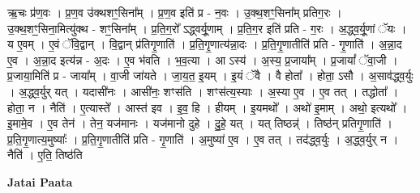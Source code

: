 \documentclass[17pt]{extarticle}
\begin{document}
ऋ॒चः प्र॑ण॒वः । प्र॒ण॒व उ॑क्थशꣳ॒॒सिना᳚म् । प्र॒ण॒व इति॑ प्र - न॒वः । उ॒क्थ॒शꣳ॒॒सिना᳚म् प्रतिग॒रः । उ॒क्थ॒शꣳ॒॒सिना॒मित्यु॑क्थ - शꣳ॒॒सिना᳚म् । प्र॒ति॒ग॒रो᳚ ऽद्ध्वर्यू॒णाम् । प्र॒ति॒ग॒र इति॑ प्रति - ग॒रः । अ॒द्ध्व॒र्यू॒णां ॅयः । य ए॒वम् । ए॒वं ॅवि॒द्वान् । वि॒द्वान् प्र॑तिगृ॒णाति॑ । प्र॒ति॒गृ॒णात्य॑न्ना॒दः । प्र॒ति॒गृ॒णातीति॑ प्रति - गृ॒णाति॑ । अ॒न्ना॒द ए॒व । अ॒न्ना॒द इत्य॑न्न - अ॒दः । ए॒व भ॑वति । भ॒व॒त्या । आ ऽस्य॑ । अ॒स्य॒ प्र॒जाया᳚म् । प्र॒जायां᳚ ॅवा॒जी । प्र॒जाया॒मिति॑ प्र - जाया᳚म् । वा॒जी जा॑यते । जा॒य॒त॒ इ॒यम् । इ॒यं ॅवै । वै होता᳚ । होता॒ ऽसौ । अ॒साव॑द्ध्व॒र्युः । अ॒द्ध्व॒र्युर् यत् । यदासी॑नः । आसी॑नः॒ शꣳस॑ति । शꣳस॑त्य॒स्याः । अ॒स्या ए॒व । ए॒व तत् । तद्धोता᳚ । होता॒ न । नैति॑ । ए॒त्यास्ते᳚ । आस्त॑ इव । इ॒व॒ हि । हीयम् । इ॒यमथो᳚ । अथो॑ इ॒माम् । अथो॒ इत्यथो᳚ । इ॒मामे॒व । ए॒व तेन॑ । तेन॒ यज॑मानः । यज॑मानो दुहे । दु॒हे॒ यत् । यत् तिष्ठन्न्॑ । तिष्ठ॑न् प्रतिगृ॒णाति॑ । प्र॒ति॒गृ॒णात्य॒मुष्याः᳚ । प्र॒ति॒गृ॒णातीति॑ प्रति - गृ॒णाति॑ । अ॒मुष्या॑ ए॒व । ए॒व तत् । तद॑द्ध्व॒र्युः । अ॒द्ध्व॒र्युर् न । नैति॑ । ए॒ति॒ तिष्ठ॑ति \newline

\textbf{Jatai Paata} \newline
\end{document}
